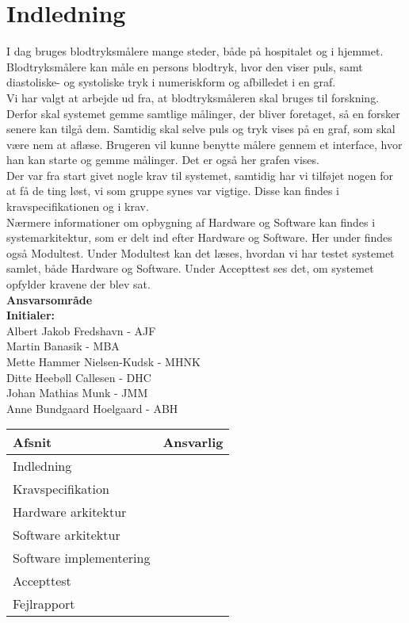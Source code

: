 \chapter{Indledning}
I  dag bruges blodtryksmålere mange steder, både på hospitalet og i hjemmet. \cite{Test} Blodtryksmålere kan måle en persons blodtryk, hvor den viser puls, samt diastoliske- og systoliske tryk i numeriskform og afbilledet i en graf.\\ 
Vi har valgt at arbejde ud fra, at blodtryksmåleren skal bruges til forskning. Derfor skal systemet gemme samtlige målinger, der bliver foretaget, så en forsker senere kan tilgå dem. Samtidig skal selve puls og tryk vises på en graf, som skal være nem at aflæse. Brugeren vil kunne benytte målere gennem et interface, hvor han kan starte og gemme målinger. Det er også her grafen vises. \\
Der var fra start givet nogle krav til systemet, samtidig har vi tilføjet nogen for at få de ting løst, vi som gruppe synes var vigtige. Disse kan findes i kravspecifikationen og i krav.\\
Nærmere informationer om opbygning af Hardware og Software kan findes i systemarkitektur, som er delt ind efter Hardware og Software. Her under findes også Modultest. 
Under Modultest kan det læses, hvordan vi har testet systemet samlet, både Hardware og Software. Under Accepttest ses det, om systemet opfylder kravene der blev sat.\\ 


\textbf{Ansvarsområde} \\
\textbf{Initialer: } \\
Albert Jakob Fredshavn - AJF \\
Martin Banasik - MBA \\
Mette Hammer Nielsen-Kudsk - MHNK \\
Ditte Heebøll Callesen - DHC \\
Johan Mathias Munk - JMM \\
Anne Bundgaard Hoelgaard - ABH \\


\begin{longtabu} to 
    Afsnit &    Ansvarlig\\[-1ex]
    \midrule
    Indledning & \\
    Kravspecifikation & \\
    Hardware arkitektur & \\
    Software arkitektur & \\
    Software implementering & \\
    Accepttest & \\
    Fejlrapport & \\
    
    
    

\end{longtabu}